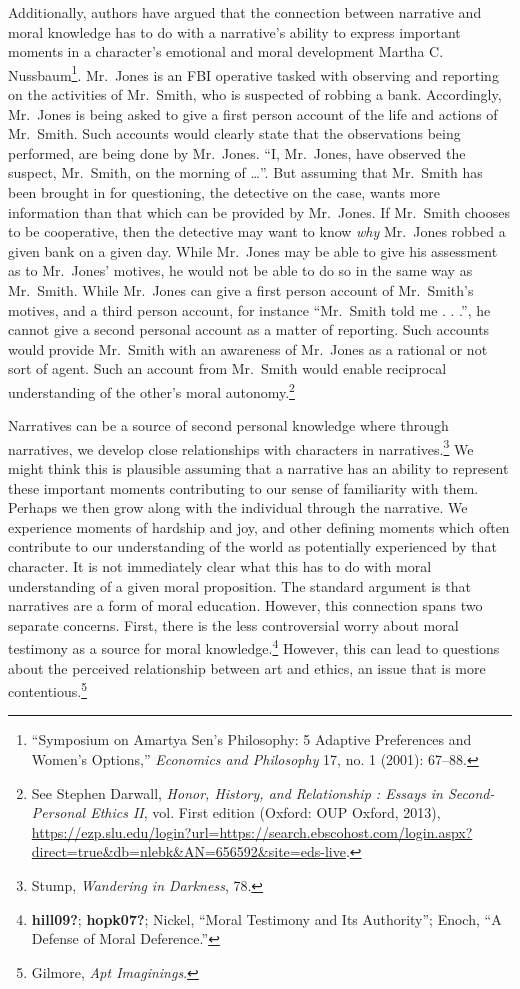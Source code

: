 \documentclass[phdthesis,12pt,final]{wuthesis}
\theoremstyle{definition}
\theoremstyle{definition}
\theoremstyle{definition}
\theoremstyle{definition}
\theoremstyle{remark}
\begin{document}
Additionally, authors have argued that the connection between narrative and moral knowledge has to do with a narrative's ability to express important moments in a character's emotional and moral development Martha C. Nussbaum\footnote{{``Symposium on {Amartya Sen}'s Philosophy: 5 Adaptive Preferences and Women's Options,''} \emph{Economics and Philosophy} 17, no. 1 (2001): 67--88.}. Mr.~Jones is an FBI operative tasked with observing and reporting on the activities of Mr.~Smith, who is suspected of robbing a bank. Accordingly, Mr.~Jones is being asked to give a first person account of the life and actions of Mr.~Smith. Such accounts would clearly state that the observations being performed, are being done by Mr.~Jones. ``I, Mr.~Jones, have observed the suspect, Mr.~Smith, on the morning of \ldots{}''. But assuming that Mr.~Smith has been brought in for questioning, the detective on the case, wants more information than that which can be provided by Mr.~Jones. If Mr.~Smith chooses to be cooperative, then the detective may want to know \emph{why} Mr.~Jones robbed a given bank on a given day. While Mr.~Jones may be able to give his assessment as to Mr.~Jones' motives, he would not be able to do so in the same way as Mr.~Smith. While Mr.~Jones can give a first person account of Mr.~Smith's motives, and a third person account, for instance ``Mr.~Smith told me . . .'', he cannot give a second personal account as a matter of reporting. Such accounts would provide Mr.~Smith with an awareness of Mr.~Jones as a rational or not sort of agent. Such an account from Mr.~Smith would enable reciprocal understanding of the other's moral autonomy.\footnote{See Stephen Darwall, \emph{Honor, {History}, and {Relationship} : {Essays} in {Second-Personal Ethics II}}, vol. First edition (Oxford: OUP Oxford, 2013), \url{https://ezp.slu.edu/login?url=https://search.ebscohost.com/login.aspx?direct=true&db=nlebk&AN=656592&site=eds-live}.}

Narratives can be a source of second personal knowledge where through narratives, we develop close relationships with characters in narratives.\footnote{Stump, \emph{Wandering in {Darkness}}, 78.} We might think this is plausible assuming that a narrative has an ability to represent these important moments contributing to our sense of familiarity with them. Perhaps we then grow along with the individual through the narrative. We experience moments of hardship and joy, and other defining moments which often contribute to our understanding of the world as potentially experienced by that character. It is not immediately clear what this has to do with moral understanding of a given moral proposition. The standard argument is that narratives are a form of moral education. However, this connection spans two separate concerns. First, there is the less controversial worry about moral testimony as a source for moral knowledge.\footnote{\textbf{hill09?}; \textbf{hopk07?}; Nickel, {``Moral {Testimony} and Its {Authority}''}; Enoch, {``A {Defense} of {Moral Deference}.''}} However, this can lead to questions about the perceived relationship between art and ethics, an issue that is more contentious.\footnote{Gilmore, \emph{Apt {Imaginings}}.}
\end{document}
